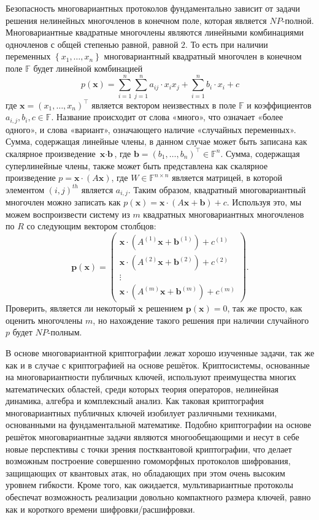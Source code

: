 \documentclass{mrl}
\begin{document}
Безопасность многовариантных протоколов фундаментально зависит от задачи решения нелинейных многочленов в конечном поле, которая является $NP$-полной.
Многовариантные квадратные многочлены являются линейными комбинациями одночленов с общей степенью равной, равной $2$. То есть при наличии переменных $\left\{x_1, \ldots, x_n\right\}$ многовариантный квадратный многочлен в конечном поле $\mathbb{F}$ будет линейной комбинацией
\[    p(\textbf{x})  = \sum_{i = 1}^{n} \sum_{j = 1}^{n} a_{ij} \cdot x_ix_j + \sum_{i=1}^{n} b_{i} \cdot x_i + c \] где $\textbf{x} = (x_1, \ldots, x_n)^\top$ является вектором неизвестных в поле $\mathbb{F}$ и коэффициентов $a_{i,j}, b_i, c \in \mathbb{F}$. Название происходит от слова «много», что означает «более одного», и слова «вариант», означающего наличие «случайных переменных». Сумма, содержащая линейные члены, в данном случае может быть записана как скалярное произведение $\textbf{x} \cdot \textbf{b}$, где $\textbf{b} = (b_1, \ldots, b_n)^\top \in \mathbb{F}^n$. Сумма, содержащая суперлинейные члены, также может быть представлена как скалярное произведение $p = \textbf{x} \cdot (A \textbf{x})$, где $W \in \mathbb{F}^{n \times n}$ является матрицей, в которой элементом $(i,j)^{th}$ является $a_{i,j}$. Таким образом, квадратный многовариантный многочлен можно записать как $p(\textbf{x}) = \textbf{x} \cdot (A\textbf{x} + \textbf{b}) + c$. Используя это, мы можем воспроизвести систему из $m$ квадратных многовариантных многочленов по $R$ со следующим вектором столбцов: \[\textbf{p}(\textbf{x}) = \begin{pmatrix}\textbf{x} \cdot \left(A^{(1)}\textbf{x} + \textbf{b}^{(1)}\right) + c^{(1)}\\
\textbf{x} \cdot \left(A^{(2)}\textbf{x} + \textbf{b}^{(2)}\right) + c^{(2)} \\
\vdots \\ 
\textbf{x} \cdot \left(A^{(m)}\textbf{x} + \textbf{b}^{(m)}\right) + c^{(m)}\end{pmatrix}.\]
Проверить, является ли некоторый $\textbf{x}$ решением $\textbf{p}(\textbf{x}) = 0$, так же просто, как оценить многочлены $m$, но нахождение такого решения при наличии случайного $p$ будет $NP$-полным.

В основе многовариантной криптографии лежат хорошо изученные задачи, так же как и в случае с криптографией на основе решёток. Криптосистемы, основанные на многовариантности публичных ключей, используют преимущества многих математических областей, среди которых теория операторов, нелинейная динамика, алгебра и комплексный анализ. Как таковая криптография многовариантных публичных ключей изобилует различными техниками, основанными на фундаментальной математике. Подобно криптографии на основе решёток многовариантные задачи являются многообещающими и несут в себе новые перспективы с точки зрения постквантовой криптографии, что делает возможным построение совершенно гомоморфных протоколов шифрования, защищающих от квантовых атак, но обладающих при этом очень высоким уровнем гибкости. Кроме того, как ожидается, мультивариантные протоколы обеспечат возможность реализации довольно компактного размера ключей, равно как и короткого времени шифровки/расшифровки.
\end{document}
